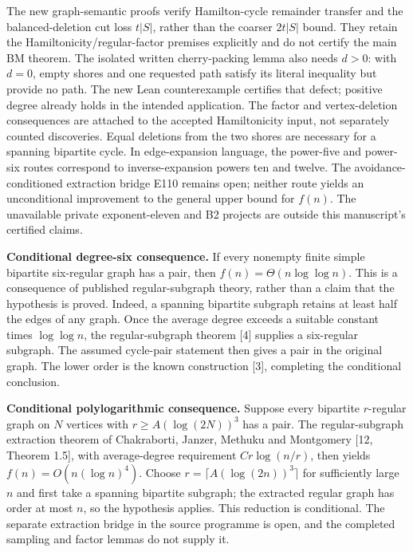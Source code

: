 \documentclass[
  11pt,
]{article}
\newcounter{none} %
\begin{document}
The new graph-semantic proofs verify Hamilton-cycle remainder transfer
and the balanced-deletion cut loss \(t|S|\), rather than the coarser
\(2t|S|\) bound. They retain the Hamiltonicity/regular-factor premises
explicitly and do not certify the main BM theorem. The isolated written
cherry-packing lemma also needs \(d>0\): with \(d=0\), empty shores and
one requested path satisfy its literal inequality but provide no path.
The new Lean counterexample certifies that defect; positive degree
already holds in the intended application. The factor and
vertex-deletion consequences are attached to the accepted Hamiltonicity
input, not separately counted discoveries. Equal deletions from the two
shores are necessary for a spanning bipartite cycle. In edge-expansion
language, the power-five and power-six routes correspond to
inverse-expansion powers ten and twelve. The avoidance-conditioned
extraction bridge E110 remains open; neither route yields an
unconditional improvement to the general upper bound for \(f(n)\). The
unavailable private exponent-eleven and B2 projects are outside this
manuscript's certified claims.

\textbf{Conditional degree-six consequence.} If every nonempty finite
simple bipartite six-regular graph has a pair, then
\(f(n)=\Theta(n\log\log n)\). This is a consequence of published
regular-subgraph theory, rather than a claim that the hypothesis is
proved. Indeed, a spanning bipartite subgraph retains at least half the
edges of any graph. Once the average degree exceeds a suitable constant
times \(\log\log n\), the regular-subgraph theorem {[}4{]} supplies a
six-regular subgraph. The assumed cycle-pair statement then gives a pair
in the original graph. The lower order is the known construction
{[}3{]}, completing the conditional conclusion.

\textbf{Conditional polylogarithmic consequence.} Suppose every
bipartite \(r\)-regular graph on \(N\) vertices with
\(r\ge A(\log(2N))^3\) has a pair. The regular-subgraph extraction
theorem of Chakraborti, Janzer, Methuku and Montgomery {[}12, Theorem
1.5{]}, with average-degree requirement \(Cr\log(n/r)\), then yields
\(f(n)=O(n(\log n)^4)\). Choose \(r=\lceil A(\log(2n))^3\rceil\) for
sufficiently large \(n\) and first take a spanning bipartite subgraph;
the extracted regular graph has order at most \(n\), so the hypothesis
applies. This reduction is conditional. The separate extraction bridge
in the source programme is open, and the completed sampling and factor
lemmas do not supply it.
\end{document}
